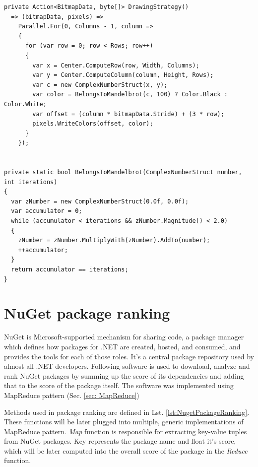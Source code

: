 \begin{lstlisting}[style=sharpcstyle, caption={Parallel Mandelbrot algorithm using value types}, label={lst:ParStructMandelbrot}]
private Action<BitmapData, byte[]> DrawingStrategy()
  => (bitmapData, pixels) =>
    Parallel.For(0, Columns - 1, column =>
    {
      for (var row = 0; row < Rows; row++)
      {
        var x = Center.ComputeRow(row, Width, Columns);
        var y = Center.ComputeColumn(column, Height, Rows);
        var c = new ComplexNumberStruct(x, y);
        var color = BelongsToMandelbrot(c, 100) ? Color.Black : Color.White;
        var offset = (column * bitmapData.Stride) + (3 * row);
        pixels.WriteColors(offset, color);
      }
    });


private static bool BelongsToMandelbrot(ComplexNumberStruct number, int iterations)
{
  var zNumber = new ComplexNumberStruct(0.0f, 0.0f);
  var accumulator = 0;
  while (accumulator < iterations && zNumber.Magnitude() < 2.0)
  {
    zNumber = zNumber.MultiplyWith(zNumber).AddTo(number);
    ++accumulator;
  }
  return accumulator == iterations;
}

\end{lstlisting}

\clearpage
\section{NuGet package ranking}
\label{sec: NuGetImp}
NuGet is Microsoft-supported mechanism for sharing code, a package manager which defines how packages for .NET are created, hosted, and consumed, and provides the tools for each of those roles. It's a central package repository used by almost all .NET developers. Following software is used to download, analyze and rank NuGet packages by summing up the score of its dependencies and adding that to the score of the package itself. The software was implemented using MapReduce pattern (Sec. \ref{sec: MapReduce}) 

Methods used in package ranking are defined in Lst. \ref{lst:NugetPackageRanking}. These functions will be later plugged into multiple, generic implementations of MapReduce pattern. \emph{Map} function is responsible for extracting key-value tuples from NuGet packages. Key represents the package name and float it's score, which will be later computed into the overall score of the package in the \emph{Reduce} function.


